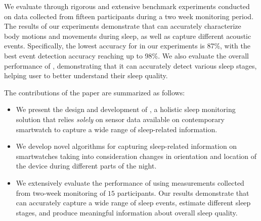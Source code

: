   
We evaluate \systemname through rigorous and extensive benchmark experiments conducted on data collected from fifteen participants during a two week monitoring period. The results of our experiments demonstrate that \systemname can accurately characterize body motions and movements during sleep, as well as capture different acoustic events. Specifically, the lowest accuracy for \systemname in our experiments is 87\%, with the best event detection accuracy reaching up to 98\%. We also evaluate the overall performance of \systemname, demonstrating that it can accurately detect various sleep stages, helping user to better understand their sleep quality.

The contributions of the paper are summarized as follows:
\begin{itemize}[noitemsep]
	\item We present the design and development of \systemname, a holistic sleep monitoring solution that relies {\em solely} on sensor data available on contemporary smartwatch to capture a wide range of sleep-related information.
	\item We develop novel algorithms for capturing sleep-related information on smartwatches taking into consideration changes in orientation and location of the device during different parts of the night.
	\item We extensively evaluate the performance of \systemname using measurements collected from two-week monitoring of $15$ participants. Our results demonstrate that \systemname can accurately capture a wide range of sleep events, estimate different sleep stages, and produce meaningful information about overall sleep quality.
\end{itemize}

